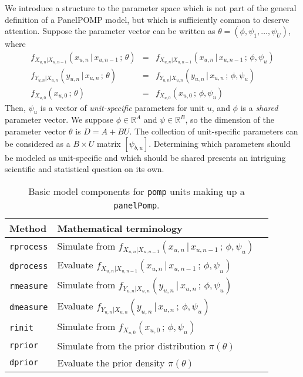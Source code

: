\documentclass[12pt]{article}\usepackage[]{graphicx}\usepackage[table]{xcolor}
\newcommand\code{\texttt}
\newcommand\unit{u} %
\newcommand\Unit{U} %
\renewcommand\time{n}
\newcommand\shared{\phi}
\newcommand\specific{\psi}
\newcommand\Nshared{A}
\newcommand\Nspecific{B}
\newcommand\nspecific{b}
\newcommand\RealSpace{\mathbb{R}}
\newcommand\Thetadim{D}
\newcommand\given{{\, | \,}}
\newcommand\giventh{{\,;\,}}
\begin{document}
We introduce a structure to the parameter space which is not part of the general definition of a PanelPOMP model, but which is sufficiently common to deserve attention.
Suppose the parameter vector can be written as
$\theta=(\shared,\specific_1,\dots,\specific_\Unit)$,
where
\begin{eqnarray}
\label{eq:b1}
f_{X_{\unit,\time}\vert X_{\unit,\time-1}}(x_{\unit,\time}\given x_{\unit,\time-1} \giventh \theta)
&=&
f_{X_{\unit,\time}|X_{\unit,\time-1}}(x_{\unit,\time}\given x_{\unit,\time-1} \giventh \shared,\specific_\unit)
\\
\label{eq:b1}
f_{Y_{\unit,\time}|X_{\unit,\time}}(y_{\unit,\time}\given x_{\unit,\time} \giventh \theta) &=& f_{Y_{\unit,\time}|X_{\unit,\time}}(y_{\unit,\time}\given x_{\unit,\time} \giventh \shared,\specific_\unit)
\\
\label{eq:b1}
f_{X_{\unit,0}}(x_{\unit,0} \giventh \theta) &=& f_{X_{\unit,0}}(x_{\unit,0} \giventh \shared,\specific_\unit)
\end{eqnarray}
Then, $\specific_{\unit}$ is a vector of \emph{unit-specific} parameters for unit $\unit$, and $\shared$ is a \emph{shared} parameter vector.
We suppose $\shared\in\RealSpace^{\Nshared}$ and $\specific\in\RealSpace^{\Nspecific}$, so the dimension of the parameter vector $\theta$ is $\Thetadim=\Nshared+\Nspecific\Unit$.
The collection of unit-specific parameters can be considered as a $\Nspecific\times\Unit$ matrix $[\specific_{\nspecific,\unit}]$.
Determining which parameters should be modeled as unit-specific and which should be shared presents an intriguing scientific and statistical question on its own.

\begin{table}[t!]
  \begin{center}
    \begin{tabular}{lll}
      \hline
      Method &Mathematical terminology \\
      \hline
      \code{rprocess} &Simulate from $f_{X_{\unit,n}|X_{\unit,n-1}}( x_{\unit,n} \given x_{\unit,n-1}\giventh \shared,\specific_\unit)$\\
      \code{dprocess} &Evaluate $f_{X_{\unit,n}|X_{\unit,n-1}}( x_{\unit,n} \given x_{\unit,n-1}\giventh \shared,\specific_{\unit})$\\
      \code{rmeasure} &Simulate from $f_{Y_{\unit,n}|X_{\unit,n}}( y_{\unit,n} \given x_{\unit,n}\giventh \shared,\specific_\unit)$\\
      \code{dmeasure} &Evaluate $f_{Y_{\unit,n}|X_{\unit,n}}( y_{\unit,n} \given x_{\unit,n}\giventh \shared,\specific_{\unit})$\\
       \code{rinit} &Simulate from $f_{X_{\unit,0}}( x_{\unit,0} \giventh \shared,\specific_\unit)$\\
    \code{rprior} & Simulate from the prior distribution $\pi(\theta)$ \\
    \code{dprior} & Evaluate the prior density $\pi(\theta)$ \\\hline
    \end{tabular}
  \end{center}
  \caption{Basic model components for \code{pomp} units making up a \code{panelPomp}.
    \label{tab:notation}
  }
\end{table}
\end{document}
